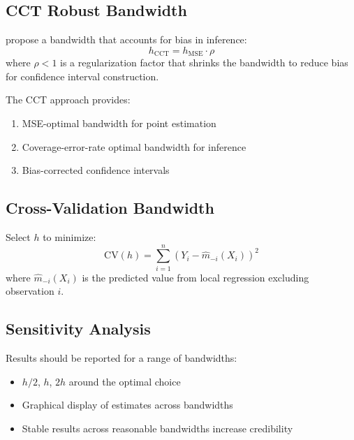 \subsection{CCT Robust Bandwidth}

\begin{definition}
\citet{calonico2014robust} propose a bandwidth that accounts for bias in inference:
\begin{equation}
    h_{\text{CCT}} = h_{\text{MSE}} \cdot \rho
\end{equation}
where $\rho < 1$ is a regularization factor that shrinks the bandwidth to reduce bias for confidence interval construction.
\end{definition}

The CCT approach provides:
\begin{enumerate}
    \item MSE-optimal bandwidth for point estimation
    \item Coverage-error-rate optimal bandwidth for inference
    \item Bias-corrected confidence intervals
\end{enumerate}

\subsection{Cross-Validation Bandwidth}

\begin{definition}
Select $h$ to minimize:
\begin{equation}
    \text{CV}(h) = \sum_{i=1}^n (Y_i - \hat{m}_{-i}(X_i))^2
\end{equation}
where $\hat{m}_{-i}(X_i)$ is the predicted value from local regression excluding observation $i$.
\end{definition}

\subsection{Sensitivity Analysis}

\begin{remark}
Results should be reported for a range of bandwidths:
\begin{itemize}
    \item $h/2$, $h$, $2h$ around the optimal choice
    \item Graphical display of estimates across bandwidths
    \item Stable results across reasonable bandwidths increase credibility
\end{itemize}
\end{remark}

